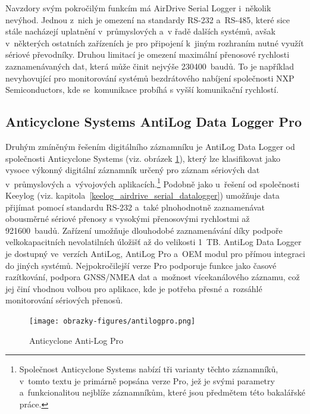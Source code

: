 Navzdory svým pokročilým funkcím má AirDrive Serial Logger i~několik nevýhod. Jednou z~nich je omezení na standardy RS-232 a~RS-485, které sice stále nacházejí uplatnění v~průmyslových a~v řadě dalších systémů, avšak v~některých ostatních zařízeních je pro připojení k~jiným rozhraním nutné využít sériové převodníky. Druhou limitací je omezení maximální přenosové rychlosti zaznamenávaných dat, která může činit nejvýše 230400~baudů. To je například nevyhovující pro monitorování systémů bezdrátového nabíjení společnosti NXP Semiconductors, kde se~komunikace probíhá s vyšší komunikační rychlostí.~\cite{keelog_airdrive_serial_datalogger}

\newpage

\subsection{Anticyclone Systems AntiLog Data Logger Pro}
\label{anticyclone_systems_antilog_data_logger}
Druhým zmíněným řešením digitálního záznamníku je AntiLog Data Logger od společnosti Anticyclone Systems (viz. obrázek \ref{fig:antilog-pro}), který lze klasifikovat jako vysoce výkonný digitální záznamník určený pro záznam sériových dat v~průmyslových a~vývojových aplikacích.\footnote{Společnost Anticyclone Systems nabízí tři varianty těchto záznamníků, v~tomto textu je primárně popsána verze Pro, jež je svými parametry a~funkcionalitou nejblíže záznamníkům, které jsou předmětem této bakalářské práce.} Podobně jako u~řešení od společnosti Keeylog (viz. kapitola~\ref{keelog_airdrive_serial_datalogger}) umožňuje data přijímat pomocí standardu RS-232 a~také plnohodnotně zaznamenávat obousměrné sériové přenosy s vysokými přenosovými rychlostmi až 921600~baudů. Zařízení umožňuje dlouhodobé zaznamenávání díky podpoře velkokapacitních nevolatilních úložišť až do velikosti 1~TB. AntiLog Data Logger je dostupný ve~verzích AntiLog, AntiLog Pro a~OEM modul pro přímou integraci do jiných systémů. Nejpokročilejší verze Pro podporuje funkce jako časové razítkování, podpora GNSS/NMEA dat a~možnost vícekanálového záznamu, což jej činí vhodnou volbou pro aplikace, kde je potřeba přesné a~rozsáhlé monitorování sériových přenosů.~\cite{anticyclone_systems_antilog_pro}

\begin{figure}[h]
    \centering
    \texttt{[image: obrazky-figures/antilogpro.png]}
    
    \caption{Anticyclone Anti-Log Pro~\cite{anticyclone_systems_antilog_pro}}
    \label{fig:antilog-pro}
\end{figure}

